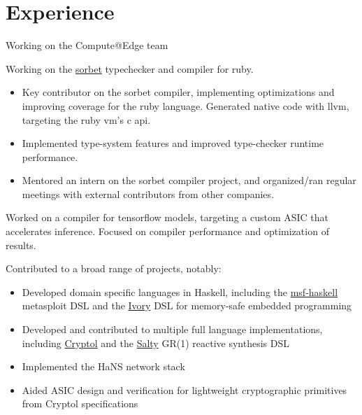 \documentclass[letter,10pt]{moderncv}
\begin{document}
\makecvtitle

\section{Experience}

  {}{Working on the Compute@Edge team}

  {}{Working on the \href{https://sorbet.org}{sorbet} typechecker and compiler for ruby.
  \begin{itemize}%
  \item Key contributor on the sorbet compiler, implementing optimizations and
    improving coverage for the ruby language. Generated native code with llvm,
    targeting the ruby vm's c api.
  \item Implemented type-system features and improved type-checker runtime performance.
  \item Mentored an intern on the sorbet compiler project, and organized/ran
    regular meetings with external contributors from other companies.
  \end{itemize}}

  {}{Worked on a compiler for tensorflow models, targeting a custom ASIC
  that accelerates inference. Focused on compiler performance and optimization
  of results.}

  {}{Contributed to a broad range of projects, notably:
  \begin{itemize}%
  \item Developed domain specific languages in Haskell, including the
    \href{https://github.com/galoisinc/msf-haskell}{msf-haskell} metasploit DSL
    and the \href{https://github.com/galoisinc/ivory}{Ivory} DSL for memory-safe
    embedded programming
  \item Developed and contributed to multiple full language implementations,
    including \href{https://github.com/galoisinc/cryptol}{Cryptol} and the
    \href{https://github.com/galoisinc/salty}{Salty} GR(1) reactive synthesis DSL
  \item Implemented the HaNS network stack
  \item Aided ASIC design and verification for lightweight cryptographic
    primitives from Cryptol specifications
  \end{itemize}}
\end{document}
